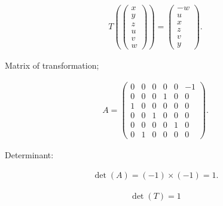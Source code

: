 \documentclass{beamer}
\theoremstyle{remark}
\numberwithin{equation}{section}
\begin{document}
\begin{align}
T\!\left(
\begin{pmatrix}
x \\ y \\ z \\ u \\ v \\ w
\end{pmatrix}
\right)
=
\begin{pmatrix}
-w \\ u \\ x \\ z \\ v \\ y
\end{pmatrix}.
\end{align}

Matrix of transformation;

\begin{align}
A =
\begin{pmatrix}
0 & 0 & 0 & 0 & 0 & -1 \\
0 & 0 & 0 & 1 & 0 & 0 \\
1 & 0 & 0 & 0 & 0 & 0 \\
0 & 0 & 1 & 0 & 0 & 0 \\
0 & 0 & 0 & 0 & 1 & 0 \\
0 & 1 & 0 & 0 & 0 & 0
\end{pmatrix}.
\end{align}

Determinant:

\begin{align}
\det(A) = (-1)\times(-1) = 1.
\end{align}

\begin{align}
{\det(T) = 1}
\end{align}
\end{document}
